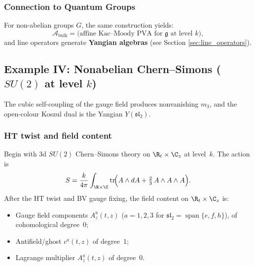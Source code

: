 \subsubsection{Connection to Quantum Groups}

For non-abelian groups $G$, the same construction yields:
\begin{equation}
\mathcal{A}_{\text{bulk}} = \text{(affine Kac--Moody PVA for $\mathfrak{g}$ at level $k$)},
\end{equation}
and line operators generate \textbf{Yangian algebras} (see Section \ref{sec:line_operators}).

\subsection{Example IV: Nonabelian Chern--Simons ($SU(2)$ at level $k$)}

The cubic self-coupling of the gauge field produces nonvanishing
$m_3$, and the open-colour Koszul dual is the Yangian
$Y(\mathfrak{sl}_2)$.

\subsubsection{HT twist and field content}

Begin with 3d $SU(2)$ Chern--Simons theory on $\R_t \times \C_z$
at level~$k$. The action is
\begin{equation}%
S = \frac{k}{4\pi} \int_{\R \times \C}
 \operatorname{tr}\!\Bigl(
 A \wedge dA + \tfrac{2}{3}\, A \wedge A \wedge A
 \Bigr).
\end{equation}
After the HT twist and BV gauge fixing, the field content on
$\R_t \times \C_z$ is:
\begin{itemize}
\item Gauge field components
 $A_z^a(t,z)$ ($a = 1,2,3$ for
 $\mathfrak{sl}_2 = \operatorname{span}\{e,f,h\}$),
 of cohomological degree~$0$;
\item Antifield/ghost $c^a(t,z)$ of degree~$1$;
\item Lagrange multiplier
 $A_{\bar z}^a(t,z)$ of degree~$0$.
\end{itemize}

